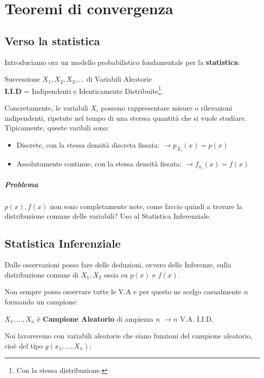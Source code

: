 \chapter{Teoremi di convergenza}
\section{Verso la statistica}
Introduciamo ora un modello probabilistico fondamentale per la \textbf{statistica}:
\begin{center}
    Successione $X_1,X_2,X_3,...$ di Variabili Aleatorie
    \\\textbf{I.I.D} = Indipendenti e Identicamente Distribuite\footnote{Con la stessa distribuzione.}.
\end{center}
Concretamente, le variabili $X_i$ possono rappresentare misure o rilevazioni indipendenti, ripetute nel tempo di una sterssa quantità che si vuole studiare.
Tipicamente, queste varibili sono:
\begin{itemize}
    \item Discrete, con la stessa densità discreta fissata: $ \rightarrow p_{X_i}(x) = p(x) $
    \item Assolutamente continue, con la stessa densità fissata: $ \rightarrow f_{x_i} (x) = f(x)$
\end{itemize}

\paragraph{Problema} $p(x), f(x)$ non sono completamente note, come faccio quindi a trovare la distribuzione comune delle variabili?
Uso al Statistica Inferenziale.
\section{Statistica Inferenziale} 
Dalle osservazioni posso fare delle deduzioni, ovvero delle Inferenze, sulla distribuzione
comune di $X_1, X_2$ ossia su $p(x)$ e $f(x)$.

Non sempre posso osservare tutte le V.A e per questo ne scelgo casualmente $n$ formando un campione: 
\begin{center}
    $X_1, \dots ,X_n$ è  \textbf{Campione Aleatorio} di ampiezza $n$ $\to n$ V.A. I.I.D. 
\end{center}
Noi lavoreremo con variabili aleatorie che siano funzioni del 
campione aleatorio, cioè del tipo $g(x_1, \dots ,X_n)$:

